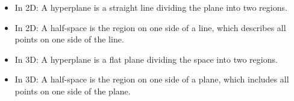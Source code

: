 \begin{intuition}
    \begin{itemize}
        \item In 2D: A hyperplane is a straight line dividing the plane into two regions.
        \item In 2D: A half-space is the region on one side of a line, which describes all points on one side of the line.
        \item In 3D: A hyperplane is a flat plane dividing the space into two regions.
        \item In 3D: A half-space is the region on one side of a plane, which includes all points on one side of the plane.
    \end{itemize}
\end{intuition}

